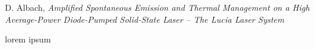 \begin{thebibliography}{}



    D. Albach,
    \emph{Amplified Spontaneous Emission and Thermal Management on a High Average-Power Diode-Pumped Solid-State Laser – The Lucia Laser System}

    lorem ipsum


\end{thebibliography}
